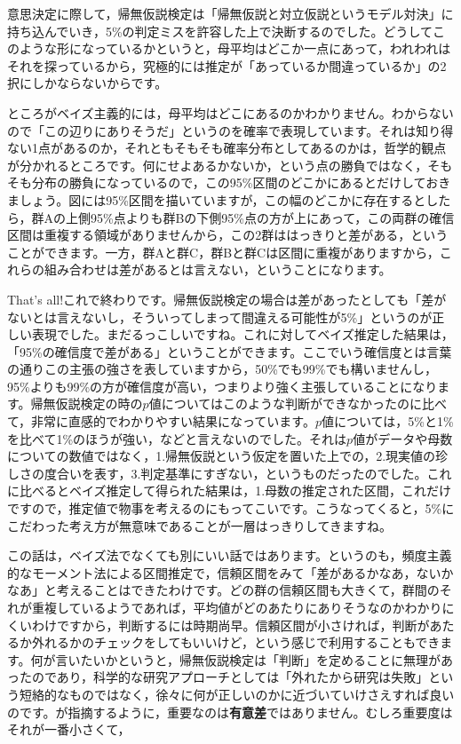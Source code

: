 \documentclass{ltjbook}
\begin{document}
意思決定に際して，帰無仮説検定は「帰無仮説と対立仮説というモデル対決」に持ち込んでいき，5\%の判定ミスを許容した上で決断するのでした。どうしてこのような形になっているかというと，母平均はどこか一点にあって，われわれはそれを探っているから，究極的には推定が「あっているか間違っているか」の2択にしかならないからです。

ところがベイズ主義的には，母平均はどこにあるのかわかりません。わからないので「この辺りにありそうだ」というのを確率で表現しています。それは知り得ない1点があるのか，それともそもそも確率分布としてあるのかは，哲学的観点が分かれるところです。何にせよあるかないか，という点の勝負ではなく，そもそも分布の勝負になっているので，この95\%区間のどこかにあるとだけしておきましょう。図には95\%区間を描いていますが，この幅のどこかに存在するとしたら，群Aの上側95\%点よりも群Bの下側95\%点の方が上にあって，この両群の確信区間は重複する領域がありませんから，この2群ははっきりと差がある，ということができます。一方，群Aと群C，群Bと群Cは区間に重複がありますから，これらの組み合わせは差があるとは言えない，ということになります。

That's all!これで終わりです。帰無仮説検定の場合は差があったとしても「差がないとは言えないし，そういってしまって間違える可能性が5\%」というのが正しい表現でした。まだるっこしいですね。これに対してベイズ推定した結果は，「95\%の確信度で差がある」ということができます。ここでいう確信度とは言葉の通りこの主張の強さを表していますから，50\%でも99\%でも構いませんし，95\%よりも99\%の方が確信度が高い，つまりより強く主張していることになります。帰無仮説検定の時の$p$値についてはこのような判断ができなかったのに比べて，非常に直感的でわかりやすい結果になっています。$p$値については，5\%と1\% を比べて1\%のほうが強い，などと言えないのでした。それは$p$値がデータや母数についての数値ではなく，1.帰無仮説という仮定を置いた上での，2.現実値の珍しさの度合いを表す，3.判定基準にすぎない，というものだったのでした。これに比べるとベイズ推定して得られた結果は，1.母数の推定された区間，これだけですので，推定値で物事を考えるのにもってこいです。こうなってくると，5\%にこだわった考え方が無意味であることが一層はっきりしてきますね。

この話は，ベイズ法でなくても別にいい話ではあります。というのも，頻度主義的なモーメント法による区間推定で，信頼区間をみて「差があるかなあ，ないかなあ」と考えることはできたわけです。どの群の信頼区間も大きくて，群間のそれが重複しているようであれば，平均値がどのあたりにありそうなのかわかりにくいわけですから，判断するには時期尚早。信頼区間が小さければ，判断があたるか外れるかのチェックをしてもいいけど，という感じで利用することもできます。何が言いたいかというと，帰無仮説検定は「判断」を定めることに無理があったのであり，科学的な研究アプローチとしては「外れたから研究は失敗」という短絡的なものではなく，徐々に何が正しいのかに近づいていけさえすれば良いのです。\textcite{Toyoda2009}が指摘するように，重要なのは\textbf{有意差}ではありません。むしろ重要度はそれが一番小さくて，
\end{document}
